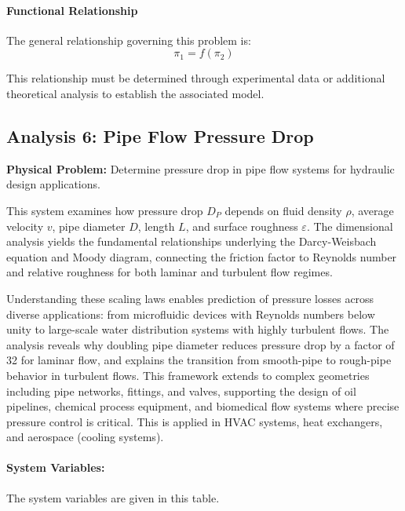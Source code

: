                     \paragraph{Functional Relationship}
                    The general relationship governing this problem is:
                    \begin{equation}
                    \pi_1 = f(\pi_2)
                    \end{equation}

                    This relationship must be determined through experimental data or additional theoretical analysis to establish the associated model.


\subsection{Analysis 6: Pipe Flow Pressure Drop}
\label{sec:Pipe_Flow_Pressure_Drop}

\begin{problembox}
\textbf{Physical Problem:} Determine pressure drop in pipe flow systems for hydraulic design applications.
\end{problembox}

This system examines how pressure drop $D_P$ depends on fluid density $\rho$, average velocity $v$, pipe diameter $D$, length $L$, and surface roughness $\varepsilon$. The dimensional analysis yields the fundamental relationships underlying the Darcy-Weisbach equation and Moody diagram, connecting the friction factor to Reynolds number and relative roughness for both laminar and turbulent flow regimes.



Understanding these scaling laws enables prediction of pressure losses across diverse applications: from microfluidic devices with Reynolds numbers below unity to large-scale water distribution systems with highly turbulent flows. The analysis reveals why doubling pipe diameter reduces pressure drop by a factor of 32 for laminar flow, and explains the transition from smooth-pipe to rough-pipe behavior in turbulent flows. This framework extends to complex geometries including pipe networks, fittings, and valves, supporting the design of oil pipelines, chemical process equipment, and biomedical flow systems where precise pressure control is critical. This is applied in HVAC systems, heat exchangers, and aerospace (cooling systems).

\paragraph{System Variables: } The system variables are given in this table.

